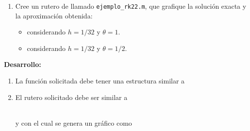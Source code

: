 \documentclass[letter,11pt]{article}
\begin{document}
\begin{enumerate}
\begin{enumerate}
\item  Cree un rutero de \octave llamado \texttt{ejemplo\_rk22.m}, que grafique la soluci\'on exacta y la aproximaci\'on obtenida:
\begin{itemize}
\item considerando $h = 1/32$ y $\theta = 1$. 
\item considerando $h = 1/32$ y $\theta = 1/2$.
\end{itemize}

\end{enumerate}

\textbf{Desarrollo:}

\begin{enumerate}
    \item La funci\'on solicitada debe tener una estructura similar a
    
    \hfill{}

    \item El rutero solicitado debe ser similar a
    
    \hfill{}\\
    y con el cual se genera un gr\'afico como
    
\end{enumerate}

\end{enumerate}
\end{document}
